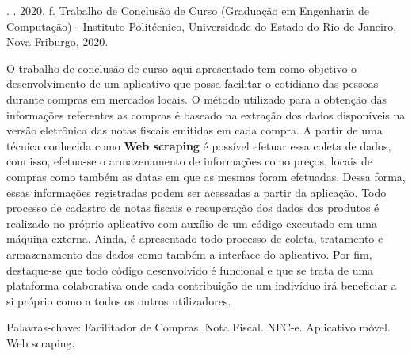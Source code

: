 \begin{resumo}
\begin{SingleSpace}

\noindent
\entradaAutor{}. \textit{\imprimirtitulo}. 2020. \pageref{LastPage} f. Trabalho de Conclusão de Curso (Graduação em Engenharia de Computação) - Instituto Politécnico, Universidade do Estado do Rio de Janeiro, Nova Friburgo, 2020.
\vspace{\onelineskip}

\setlength{\parindent}{1.3cm}
O trabalho de conclusão de curso aqui apresentado tem como objetivo o desenvolvimento de um aplicativo que possa facilitar o cotidiano das pessoas durante compras em mercados locais. O método utilizado para a obtenção das informações referentes as compras é baseado na extração dos dados disponíveis na versão eletrônica das notas fiscais emitidas em cada compra. A partir de uma técnica conhecida como \textbf{Web scraping} é possível efetuar essa coleta de dados, com isso, efetua-se o armazenamento de informações como preços, locais de compras como também as datas em que as mesmas foram efetuadas. Dessa forma, essas informações registradas podem ser acessadas a partir da aplicação. Todo processo de cadastro de notas fiscais e recuperação dos dados dos produtos é realizado no próprio aplicativo com auxílio de um código executado em uma máquina externa. Ainda, é apresentado todo processo de coleta, tratamento e armazenamento dos dados como também a interface do aplicativo. Por fim, destaque-se que todo código desenvolvido é funcional e que se trata de uma plataforma colaborativa onde cada contribuição de um indivíduo irá beneficiar a si próprio como a todos os outros utilizadores.

\vspace{\onelineskip}
\noindent Palavras-chave: Facilitador de Compras. Nota Fiscal. NFC-e. Aplicativo móvel. Web scraping.

\end{SingleSpace}
\end{resumo}